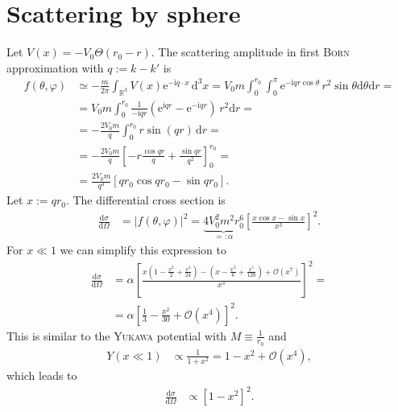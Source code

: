 \documentclass[english, parskip=full]{scrartcl}
\newcommand{\intx}{}
\newcommand{\intr}{}
\newcommand{\kla}{}
\newcommand{\klam}{}
\newcommand{\tecxt}{}
\def\I{\text{i}}
\def\e{\text{e}}
\begin{document}
\section{Scattering by sphere}
Let $V(x)=-V_0\Theta (r_0-r)$.
The scattering amplitude in first \textsc{Born} approximation with $q:=k-k'$ is
\begin{align}
f(\theta,\varphi)&\simeq -\frac{m}{2\pi}\intr\int_{\mathbb{R}^{3}}V(x)\e^{-\I q\cdot x}\,\mathrm{d}^{3}x=V_0m\intx\int_{0}^{r_0}\intx\int_{0}^{\pi}\e^{-\I qr\cos\theta}\,r^2\sin\theta\mathrm{d}\theta\mathrm{d}r=\\
&=V_0m\intx\int_{0}^{r_0}\frac{1}{-\I qr}\kla\left( {\e^{\I qr}-\e^{-\I qr}} \right)\,r^2\mathrm{d}r=\\
&=-\frac{2V_0m}{q}\intx\int_{0}^{r_0}r\sin (qr)\,\mathrm{d}r=\\
&=-\frac{2V_0m}{q}\klam\left[ {-r\frac{\cos qr}{q}+\frac{\sin qr}{q^2}} \right]_0^{r_0}=\\
&=\frac{2V_0m}{q^3}\klam\left[ {qr_0\cos qr_0-\sin qr_0} \right].
\end{align}
Let $x:=qr_0$.
The differential cross section is
\begin{align}
\frac{\tecxt\text{d}\sigma}{\tecxt\text{d}\Omega}&=|f(\theta,\varphi)|^2=\underbrace{4V_0^2m^2r_0^6}_{=:\alpha}\klam\left[ \frac{x\cos x-\sin x}{x^3} \right]^2.
\end{align}
For $x\ll 1$ we can simplify this expression to
\begin{align}
\frac{\tecxt\text{d}\sigma}{\tecxt\text{d}\Omega}&= \alpha\klam\left[ {\frac{x\kla\left( {1-\frac{x^2}{2}+\frac{x^4}{24}} \right)-\kla\left( {x-\frac{x^3}{6}+\frac{x^5}{120}} \right)+\mathcal{O}(x^7)}{x^3}} \right]^2=\\
&= \alpha\klam\left[ {\frac{1}{3}-\frac{x^2}{30}+\mathcal{O}(x^4)} \right]^2.
\end{align}
This is similar to the \textsc{Yukawa} potential with $M\equiv\frac{1}{r_0}$ and 
\begin{align}
Y(x\ll 1)&\propto \frac{1}{1+x^2}=1-x^2+\mathcal{O}(x^4),
\end{align}
which leads to 
\begin{align}
\frac{\tecxt\text{d}\sigma}{\tecxt\text{d}\Omega}&\propto \klam\left[ {1-x^2} \right]^2.
\end{align}
\end{document}
